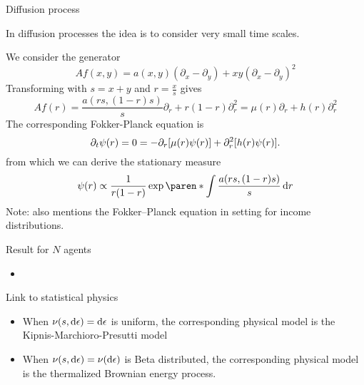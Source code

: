 \documentclass[9pt, handout]{beamer}
\begin{document}
\begin{frame}{Diffusion process}

In diffusion processes the idea is to consider very small time scales.

We consider the generator
\[
Af(x, y) = a(x, y)(\partial_x - \partial_y) + xy (\partial_x - \partial_y)^2
\]
Transforming with $s = x+y$ and $r = \frac{x}{s}$ gives
\[
Af(r)
= \frac{a(rs, (1-r)s)}{s}\partial_r + r(1-r) \partial_r^2
= \mu(r)\partial_r + h(r) \partial_r^2
\]
\pause
The corresponding Fokker-Planck equation is
\[
\partial_t \psi(r) = 0 =
- \partial_r[\mu(r) \psi(r)] + \partial_r^2[h(r) \psi(r)].
\]
\pause
from which we can derive the stationary measure
\[
\psi(r) \propto \frac{1}{r(1-r)}\exp\paren*{\int\frac{a(rs, (1-r)s)}{s} \diff r} %
\]
Note:  also mentions the Fokker--Planck equation in setting for income distributions.
\end{frame}




\begin{frame}{Result for $N$ agents}
\begin{itemize}
    \item
\end{itemize}
\end{frame}




\begin{frame}{Link to statistical physics}
\begin{itemize}
    \item When $\nu(s, \mathop{}\!\mathrm{d} \epsilon) = \mathop{}\!\mathrm{d}\epsilon$ is uniform, the corresponding physical model is the Kipnis-Marchioro-Presutti model
    \item When $\nu(s, \mathop{}\!\mathrm{d} \epsilon) = \nu(\mathop{}\!\mathrm{d}\epsilon)$ is Beta distributed, the corresponding physical model is the thermalized Brownian energy process.
\end{itemize}
\end{frame}
\end{document}
